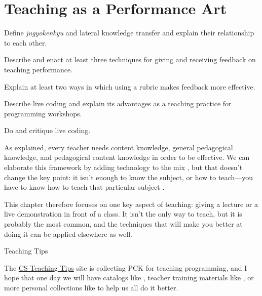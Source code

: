 \chapter{Teaching as a Performance Art}\label{s:performance}

\begin{objectives}

\item Define \emph{jugyokenkyu} and lateral knowledge transfer and
  explain their relationship to each other.

\item Describe and enact at least three techniques for giving and
  receiving feedback on teaching performance.

\item Explain at least two ways in which using a rubric makes feedback
  more effective.

\item Describe live coding and explain its advantages as a teaching
  practice for programming workshops.

\item Do and critique live coding.

\end{objectives}

As  explained, every teacher needs content knowledge,
general pedagogical knowledge, and pedagogical content knowledge in
order to be effective.  We can elaborate this framework by adding
technology to the mix \cite{Koeh2013}, but that doesn't change the key
point: it isn't enough to know the subject, or how to teach---you have
to know how to teach that particular subject \cite{Maye2004}.

This chapter therefore focuses on one key aspect of teaching: giving a
lecture or a live demonstration in front of a class.  It isn't the
only way to teach, but it is probably the most common, and the
techniques that will make you better at doing it can be applied
elsewhere as well.

\begin{callout}{Teaching Tips}

  The \href{http://csteachingtips.org/}{CS Teaching Tips} site is
  collecting PCK for teaching programming, and I hope that one day we
  will have catalogs like \cite{Ojos2015}, teacher training materials
  like \cite{Hazz2014,Guzd2015a,Sent2018}, or more personal
  collections like \cite{Gelm2002} to help us all do it better.

\end{callout}

